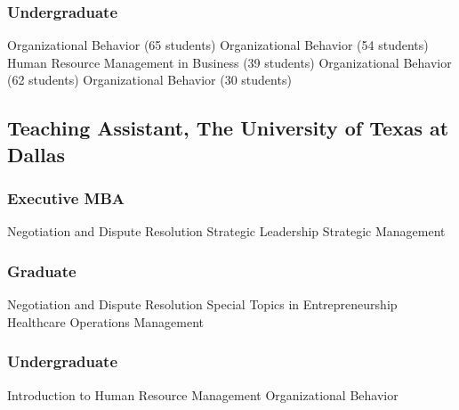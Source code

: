 \subsubsection*{Undergraduate}

\begin{entries}[\cvdatewwide]
Organizational Behavior (65 students)
Organizational Behavior (54 students)
Human Resource Management in Business (39 students)
Organizational Behavior (62 students)
Organizational Behavior (30 students)
\end{entries}

\subsection*{Teaching Assistant, The University of Texas at Dallas}

\subsubsection*{Executive MBA}

\begin{entries}[\cvdatewwide]
Negotiation and Dispute Resolution
Strategic Leadership
Strategic Management
\end{entries}

\subsubsection*{Graduate}

\begin{entries}[\cvdatewwide]
Negotiation and Dispute Resolution
Special Topics in Entrepreneurship
Healthcare Operations Management
\end{entries}

\subsubsection*{Undergraduate}

\begin{entries}[\cvdatewwide]
Introduction to Human Resource Management
Organizational Behavior
\end{entries}

\else
